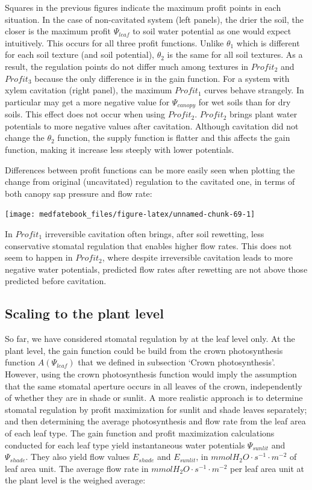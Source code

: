 \documentclass[]{book}
\begin{document}
Squares in the previous figures indicate the maximum profit points in
each situation. In the case of non-cavitated system (left panels), the
drier the soil, the closer is the maximum profit \(\Psi_{leaf}\) to soil
water potential as one would expect intuitively. This occurs for all
three profit functions. Unlike \(\theta_1\) which is different for each
soil texture (and soil potential), \(\theta_2\) is the same for all soil
textures. As a result, the regulation points do not differ much among
textures in \(Profit_2\) and \(Profit_3\) because the only difference is
in the gain function. For a system with xylem cavitation (right panel),
the maximum \(Profit_1\) curves behave strangely. In particular may get
a more negative value for \(\Psi_{canopy}\) for wet soils than for dry
soils. This effect does not occur when using \(Profit_2\). \(Profit_2\)
brings plant water potentials to more negative values after cavitation.
Although cavitation did not change the \(\theta_2\) function, the supply
function is flatter and this affects the gain function, making it
increase less steeply with lower potentials.

Differences between profit functions can be more easily seen when
plotting the change from original (uncavitated) regulation to the
cavitated one, in terms of both canopy sap pressure and flow rate:

\begin{center}\texttt{[image: medfatebook\_files/figure-latex/unnamed-chunk-69-1]} \end{center}

In \(Profit_1\) irreversible cavitation often brings, after soil
rewetting, less conservative stomatal regulation that enables higher
flow rates. This does not seem to happen in \(Profit_2\), where despite
irreversible cavitation leads to more negative water potentials,
predicted flow rates after rewetting are not above those predicted
before cavitation.

\subsection{Scaling to the plant
level}\label{scaling-to-the-plant-level}

So far, we have considered stomatal regulation by at the leaf level
only. At the plant level, the gain function could be build from the
crown photosynthesis function \(A(\Psi_{leaf})\) that we defined in
subsection `Crown photosynthesis'. However, using the crown
photosynthesis function would imply the assumption that the same
stomatal aperture occurs in all leaves of the crown, independently of
whether they are in shade or sunlit. A more realistic approach is to
determine stomatal regulation by profit maximization for sunlit and
shade leaves separately; and then determining the average photosynthesis
and flow rate from the leaf area of each leaf type. The gain function
and profit maximization calculations conducted for each leaf type yield
instantaneous water potentials \(\Psi_{sunlit}\) and \(\Psi_{shade}\).
They also yield flow values \(E_{shade}\) and \(E_{sunlit}\), in
\(mmol H_2O \cdot s^{-1} \cdot m^{-2}\) of leaf area unit. The average
flow rate in \(mmol H_2O \cdot s^{-1} \cdot m^{-2}\) per leaf area unit
at the plant level is the weighed average:
\end{document}
